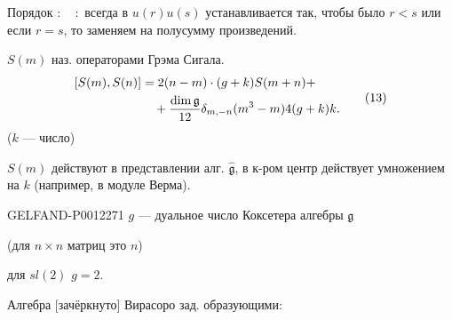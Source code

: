Порядок \({:}\quad{:}\) всегда в \(u(r)u(s)\) устанавливается так, чтобы было
\(r<s\) или если \(r=s\), то заменяем на полусумму произведений.

\(S(m)\) наз. операторами Грэма Сигала.
\begin{equation*}
\begin{aligned}
\relax [S(m),S(n)]&=2(n-m)\cdot(g+k)S(m+n)+\\
&\quad+\frac{\dim\mathfrak g}{12}\delta_{m,-n}(m^3-m)4(g+k)k.
\end{aligned}\tag{13}
\end{equation*}
(\(k\) --- число)

\(S(m)\) действуют в представлении алг. \(\widehat{\mathfrak g}\), в к-ром центр действует умножением на \(k\) (например, в модуле Верма).


\begin{GelfandAdjacentEvidence}{GELFAND-P001227}{1}
\(g\) --- дуальное число Коксетера алгебры \(\mathfrak g\)

(для \(n\times n\) матриц это \(n\))

для \(sl(2)\) \(g=2\).

Алгебра [зачёркнуто] Вирасоро зад. образующими:
\end{GelfandAdjacentEvidence}
